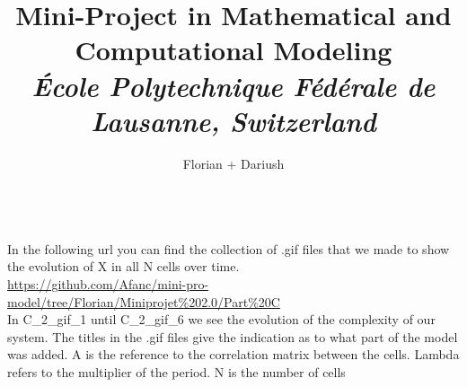 \documentclass[10pt,a4paper,oneside,twocolumn]{article}
\numberwithin{equation}{section} %
\begin{document}
\title{\huge{\textbf{Mini-Project in Mathematical and Computational Modeling}}\\
	\vspace{0.5cm}
	\Large{\textit{\'Ecole Polytechnique F\'ed\'erale de Lausanne, Switzerland}}}
\author{\large{Florian + Dariush}}

    
    \par
    \hfill \\
    In the following url you can find the collection of .gif files that we made to show the evolution of X in all N cells over time. \\
    \url{https://github.com/Afanc/mini-pro-model/tree/Florian/Miniprojet\%202.0/Part\%20C} \\
    In C\_2\_gif\_1 until C\_2\_gif\_6 we see the evolution of the complexity of our system. The titles in the .gif files give the indication as to what part of the model was added. A is the reference to the correlation matrix between the cells. Lambda refers to the multiplier of the period. N is the number of cells
\end{document}
